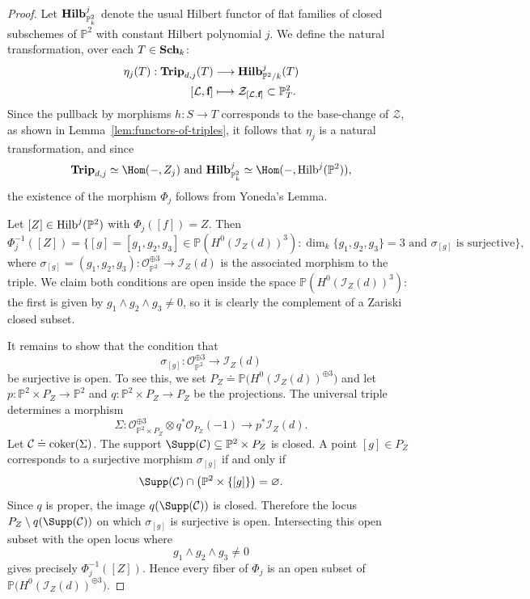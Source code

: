\documentclass[11pt]{amsart} %
\newcommand{\lar}{\longrightarrow}
\theoremstyle{definition}
\def\coker{\mbox{\rm coker}}
\def\NZQ{\mathbb}               %
\def\PP{{\NZQ P}}
\def\Trip{{\bf Trip}}
\def\Sch{{\bf Sch}}
\def\HilbertF{{\bf Hilb}}
\def\Hilbert{{\rm Hilb}}
\begin{document}
\begin{proof}
Let $\HilbertF^j_{\mathbb{P}^2_k}$ denote the usual Hilbert functor of flat families of closed subschemes of $\mathbb{P}^2$ with constant Hilbert polynomial $j$. We define the natural transformation, over each $T \in \Sch_k$:
\begin{align*}
\eta_j(T) : \Trip_{d,j}(T) &\lar \HilbertF^j_{\mathbb{P}^2/k}(T)\\
[\mathcal{L}, \textbf{f}] &\longmapsto \mathcal{Z}_{[\mathcal{L}, \textbf{f}]} \subset \mathbb{P}^2_T.
\end{align*}
Since the pullback by morphisms $h: S \lar T$ corresponds to the base-change of $\mathcal{Z}$, as shown in Lemma~\ref{lem:functors-of-triples}, it follows that $\eta_j$ is a natural transformation, and since 
$$
\Trip_{d,j} \simeq \Hom(-, Z_j) \text{ and } \HilbertF^j_{\mathbb{P}^2_k} \simeq \Hom(-, \Hilbert^j(\mathbb{P}^2)),
$$
the existence of the morphism $\Phi_j$ follows from Yoneda's Lemma.

Let $[Z] \in \Hilbert^j(\mathbb{P}^2)$ with $\Phi_j([f]) = Z$. Then
$$
\Phi_j^{-1}([Z]) = \{[g]=[g_1, g_2, g_3] \in \mathbb{P}(H^0(\mathcal{I}_Z(d))^{3}) : \dim_k \{g_1, g_2, g_3\} = 3\text{ and }\sigma_{[g]} \text{ is surjective}\},
$$
where $\sigma_{[g]} = (g_1, g_2, g_3): \mathcal{O}_{\mathbb{P}^2}^{\oplus 3} \lar \mathcal{I}_Z(d)$ is the associated morphism to the triple. We claim both conditions are open inside the space $\mathbb{P}(H^0(\mathcal{I}_Z(d))^3)$: the first is given by $g_1 \wedge g_2 \wedge g_3 \neq 0$, so it is clearly the complement of a Zariski closed subset. 

It remains to show that the condition that
\[
\sigma_{[g]}:
\mathcal O_{\PP^2}^{\oplus3}
\longrightarrow
\mathcal I_Z(d)
\]
be surjective is open. To see this, we set \(P_Z\doteq
\PP\bigl(H^0(\mathcal I_Z(d))^{\oplus3}\bigr)\)
and let \(p:\PP^2\times P_Z\lar\PP^2\) and \(q:\PP^2\times P_Z\lar P_Z\) be the projections. The universal triple determines a morphism
\[
\Sigma:
\mathcal O_{\PP^2\times P_Z}^{\oplus3}
\otimes q^*\mathcal O_{P_Z}(-1)
\longrightarrow
p^*\mathcal I_Z(d).
\]
Let \(
\mathcal C\doteq\coker(\Sigma)\). The support \(
\Supp(\mathcal C)
\subseteq
\PP^2\times P_Z\) is closed. A point $[g]\in P_Z$ corresponds to a surjective morphism
$\sigma_{[g]}$ if and only if
\[
\Supp(\mathcal C)\cap
\bigl(\PP^2\times\{[g]\}\bigr)
=
\varnothing.
\]
Since $q$ is proper, the image \(q(\Supp(\mathcal C))\) is closed. Therefore the locus \(P_Z\setminus q(\Supp(\mathcal C))\) on which $\sigma_{[g]}$ is surjective is open. Intersecting this open subset with the open locus where
\[
g_1\wedge g_2\wedge g_3\neq0
\]
gives precisely $\Phi_j^{-1}([Z])$. Hence every fiber of $\Phi_j$ is
an open subset of \(\PP\bigl(H^0(\mathcal I_Z(d))^{\oplus3}\bigr)\).
\end{proof}
\end{document}
